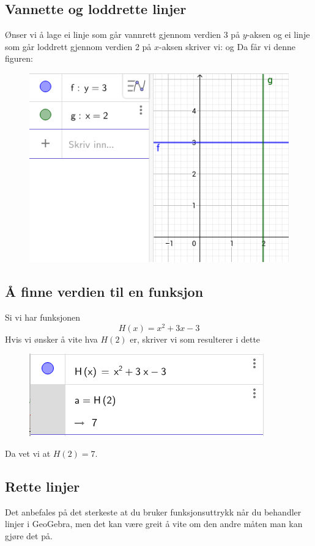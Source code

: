 \subsection{Vannette og loddrette linjer}

Ønser vi å lage ei linje som går vannrett gjennom verdien 3 på $ y $-aksen og ei linje som går loddrett gjennom verdien 2 på $ x $-aksen skriver vi:
og 
Da får vi denne figuren:
\begin{figure}[H]
	\centering
	\includegraphics[scale=0.5]{23}
\end{figure}

\subsection{Å finne verdien til en funksjon}
Si vi har funksjonen
\[H(x)= x^2 + 3x -3 \]
Hvis vi ønsker å vite hva $ H(2) $ er, skriver vi
som resulterer i dette
\begin{figure}[H]
	\centering
	\includegraphics[scale=0.5]{H}
\end{figure}
Da vet vi at $ H(2)=7 $.\vsk


\newpage
\subsection{Rette linjer}
Det anbefales på det sterkeste at du bruker funksjonsuttrykk når du behandler linjer i GeoGebra, men det kan være greit å vite om den andre måten man kan gjøre det på. \vsk

